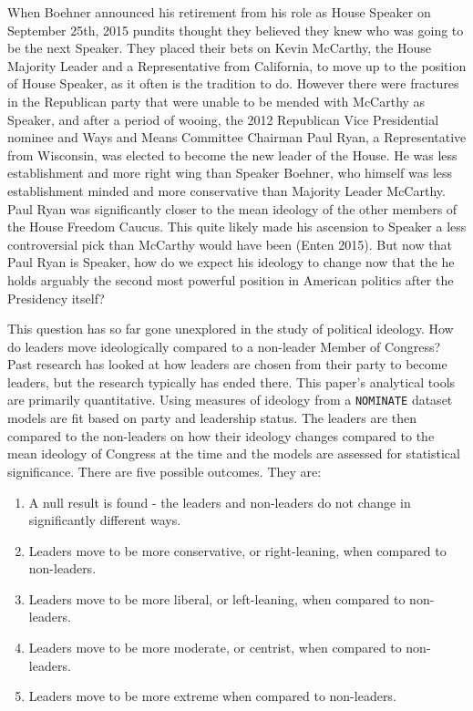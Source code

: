 \documentclass[12pt,twoside]{reedthesis}
\begin{document}
  When Boehner announced his retirement from his role as House Speaker on
  September 25th, 2015 pundits thought they believed they knew who was
  going to be the next Speaker. They placed their bets on Kevin McCarthy,
  the House Majority Leader and a Representative from California, to move
  up to the position of House Speaker, as it often is the tradition to do.
  However there were fractures in the Republican party that were unable to
  be mended with McCarthy as Speaker, and after a period of wooing, the
  2012 Republican Vice Presidential nominee and Ways and Means Committee
  Chairman Paul Ryan, a Representative from Wisconsin, was elected to
  become the new leader of the House. He was less establishment and more
  right wing than Speaker Boehner, who himself was less establishment
  minded and more conservative than Majority Leader McCarthy. Paul Ryan
  was significantly closer to the mean ideology of the other members of
  the House Freedom Caucus. This quite likely made his ascension to
  Speaker a less controversial pick than McCarthy would have been (Enten
  2015). But now that Paul Ryan is Speaker, how do we expect his ideology
  to change now that the he holds arguably the second most powerful
  position in American politics after the Presidency itself?
  
  This question has so far gone unexplored in the study of political
  ideology. How do leaders move ideologically compared to a non-leader
  Member of Congress? Past research has looked at how leaders are chosen
  from their party to become leaders, but the research typically has ended
  there. This paper's analytical tools are primarily quantitative. Using
  measures of ideology from a \texttt{NOMINATE} dataset models are fit
  based on party and leadership status. The leaders are then compared to
  the non-leaders on how their ideology changes compared to the mean
  ideology of Congress at the time and the models are assessed for
  statistical significance. There are five possible outcomes. They are:
  
  \begin{enumerate}
  \def\labelenumi{\arabic{enumi}.}
  \itemsep1pt\parskip0pt
  \item
    A null result is found - the leaders and non-leaders do not change in
    significantly different ways.
  \item
    Leaders move to be more conservative, or right-leaning, when compared
    to non-leaders.
  \item
    Leaders move to be more liberal, or left-leaning, when compared to
    non-leaders.
  \item
    Leaders move to be more moderate, or centrist, when compared to
    non-leaders.
  \item
    Leaders move to be more extreme when compared to non-leaders.
  \end{enumerate}
  
\end{document}
